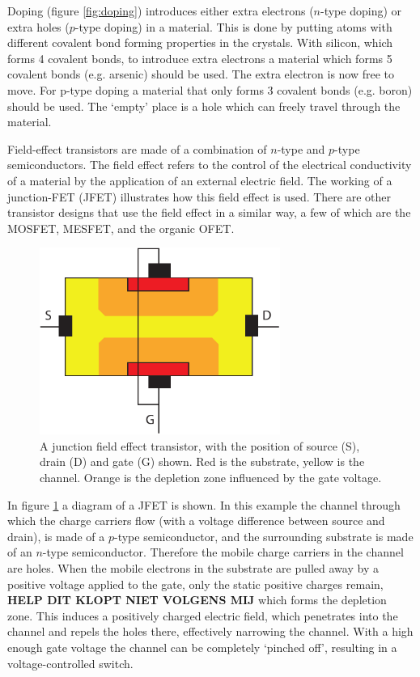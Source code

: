 Doping (figure \ref{fig:doping}) introduces either extra electrons ($n$-type doping) or extra holes ($p$-type doping) in a material. This is done by putting atoms with different covalent bond forming properties in the crystals. With silicon, which forms 4 covalent bonds, to introduce extra electrons a material which forms 5 covalent bonds (e.g. arsenic) should be used. The extra electron is now free to move. For p-type doping a material that only forms 3 covalent bonds (e.g. boron) should be used. The `empty' place is a hole which can freely travel through the material.

Field-effect transistors are made of a combination of $n$-type and $p$-type semiconductors. The field effect refers to the control of the electrical conductivity of a material by the application of an external electric field. The working of a junction-FET (JFET) illustrates how this field effect is used. There are other transistor designs that use the field effect in a similar way, a few of which are the MOSFET, MESFET, and the organic OFET.

\begin{figure}[!ht]
 \begin{center}
  \includegraphics[width=0.7\textwidth]{jfet}
  \caption{A junction field effect transistor, with the position of source (S), drain (D) and gate (G) shown. Red is the substrate, yellow is the channel. Orange is the depletion zone influenced by the gate voltage.}
  \label{fig:JFET}
 \end{center}
\end{figure}

In figure \ref{fig:JFET} a diagram of a JFET is shown. In this example the channel through which the charge carriers flow (with a voltage difference between source and drain), is made of a $p$-type semiconductor, and the surrounding substrate is made of an $n$-type semiconductor. Therefore the mobile charge carriers in the channel are holes. When the mobile electrons in the substrate are pulled away by a positive voltage applied to the gate, only the static positive charges remain, \textbf{HELP DIT KLOPT NIET VOLGENS MIJ} which forms the depletion zone. This induces a positively charged electric field, which penetrates into the channel and repels the holes there, effectively narrowing the channel. With a high enough gate voltage the channel can be completely `pinched off', resulting in a voltage-controlled switch.

